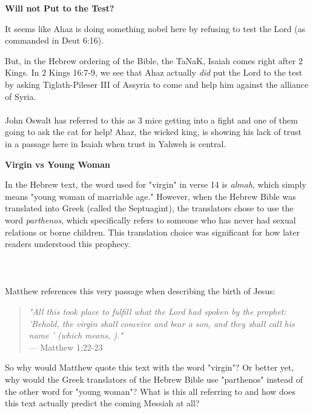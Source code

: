 \documentclass[11pt]{article}
\begin{document}
\vspace{3em}
{\large\bfseries Will not Put to the Test?}
\vspace{1em}

It seems like Ahaz is doing something nobel here by refusing to test the Lord (as commanded in Deut 6:16).

But, in the Hebrew ordering of the Bible, the TaNaK, Isaiah comes right after 2 Kings. In 2 Kings 16:7-9, we see that Ahaz actually \textit{did} put the Lord to the test by asking Tiglath-Pileser III of Assyria to come and help him against the alliance of Syria.
\\\\
John Oswalt has referred to this as 3 mice getting into a fight and one of them going to ask the cat for help! Ahaz, the wicked king, is showing his lack of trust in a passage here in Isaiah when trust in Yahweh is central.

\newpage

{\large\bfseries Virgin vs Young Woman}
\vspace{1em}


In the Hebrew text, the word used for "virgin" in verse 14 is \textit{almah}, which simply means "young woman of marriable age." However, when the Hebrew Bible was translated into Greek (called the Septuagint), the translators chose to use the word \textit{parthenos}, which specifically refers to someone who has never had sexual relations or borne children. This translation choice was significant for how later readers understood this prophecy.
\\\\\\\\
Matthew references this very passage when describing the birth of Jesus:
\\
\begin{quote}
\textit{"All this took place to fulfill what the Lord had spoken by the prophet: 'Behold, the virgin shall conceive and bear a son, and they shall call his name ' (which means, )."} \\
\hfill --- Matthew 1:22-23
\end{quote}
{\vspace{1em}}
So why would Matthew quote this text with the word "virgin"? Or better yet, why would the Greek translators of the Hebrew Bible use "parthenos" instead of the other word for "young woman"? What is this all referring to and how does this text actually predict the coming Messiah at all?
\end{document}
